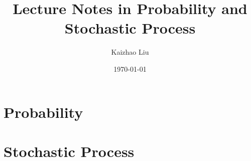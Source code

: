 \documentclass{book}
\title{Lecture Notes in Probability and Stochastic Process}
\author{Kaizhao Liu}
\date{\today}
\begin{document}
\maketitle
\tableofcontents

\part{Probability}









\part{Stochastic Process}






%
\end{document}
